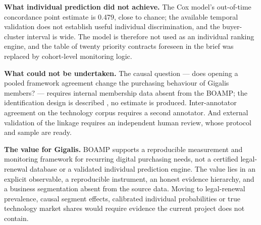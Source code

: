 \textbf{What individual prediction did not achieve.} The Cox model's out-of-time concordance point estimate is 0.479, close to chance; the available temporal validation does not establish useful individual discrimination, and the buyer-cluster interval is wide. The model is therefore not used as an individual ranking engine, and the table of twenty priority contracts foreseen in the brief was replaced by cohort-level monitoring logic.

\textbf{What could not be undertaken.} The causal question --- does opening a pooled framework agreement change the purchasing behaviour of Gigalis members? --- requires internal membership data absent from the BOAMP; the identification design is described \citep{angrist2009}, no estimate is produced. Inter-annotator agreement on the technology corpus requires a second annotator. And external validation of the linkage requires an independent human review, whose protocol and sample are ready.

\textbf{The value for Gigalis.} BOAMP supports a reproducible measurement and monitoring framework for recurring digital purchasing needs, not a certified legal-renewal database or a validated individual prediction engine. The value lies in an explicit observable, a reproducible instrument, an honest evidence hierarchy, and a business segmentation absent from the source data. Moving to legal-renewal prevalence, causal segment effects, calibrated individual probabilities or true technology market shares would require evidence the current project does not contain.
